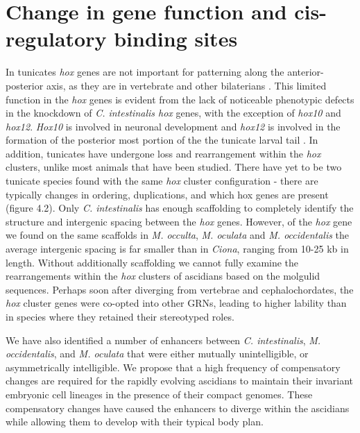\section{Change in gene function and cis-regulatory binding sites}
In tunicates \textit{hox} genes are not important for patterning along the anterior-posterior axis, as they are in vertebrate and other bilaterians \cite{finnerty_origins_2003,mallo_regulation_2013,ikuta_limited_2010}. This limited function in the \textit{hox} genes is evident from the lack of noticeable phenotypic defects in the knockdown of \textit{C. intestinalis hox} genes, with the exception of \textit{hox10} and \textit{hox12}. \textit{Hox10} is involved in neuronal development and \textit{hox12} is involved in the formation of the posterior most portion of the the tunicate larval tail \cite{ikuta_limited_2010}. In addition, tunicates have undergone loss and rearrangement within the \textit{hox} clusters, unlike most animals that have been studied\cite{ikuta_organization_2005}. There have yet to be two tunicate species found with the same \textit{hox} cluster configuration - there are typically changes in ordering, duplications, and which hox genes are present (figure 4.2). Only \textit{C. intestinalis} has enough scaffolding to completely identify the structure and intergenic spacing between the \textit{hox} genes. However, of the \textit{hox} gene we found on the same scaffolds in \textit{M. occulta}, \textit{M. oculata} and \textit{M. occidentalis} the average intergenic spacing is far smaller than in {\em Ciona}, ranging from 10-25 kb in length. Without additionally scaffolding we cannot fully examine the rearrangements within the \textit{hox} clusters of ascidians based on the molgulid sequences. Perhaps soon after diverging from vertebrae and cephalochordates, the \textit{hox} cluster genes were co-opted into other GRNs, leading to higher lability than in species where they retained their stereotyped roles.

We have also identified a number of enhancers between \textit{C. intestinalis}, \textit{M. occidentalis}, and \textit{M. oculata} that were either mutually unintelligible, or asymmetrically intelligible. We propose that a high frequency of compensatory changes are required for the rapidly evolving ascidians to maintain their invariant embryonic cell lineages in the presence of their compact genomes. These compensatory changes have caused the enhancers to diverge within the ascidians while allowing them to develop with their typical body plan.

